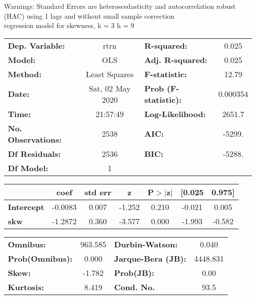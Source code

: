 Warnings: \newline
 [1] Standard Errors are heteroscedasticity and autocorrelation robust (HAC) using 1 lags and without small sample correction\\ 

regression model for skewness, k = 3 h = 9\begin{center}
\begin{tabular}{lclc}
\toprule
\textbf{Dep. Variable:}    &       rtrn       & \textbf{  R-squared:         } &     0.025   \\
\textbf{Model:}            &       OLS        & \textbf{  Adj. R-squared:    } &     0.025   \\
\textbf{Method:}           &  Least Squares   & \textbf{  F-statistic:       } &     12.79   \\
\textbf{Date:}             & Sat, 02 May 2020 & \textbf{  Prob (F-statistic):} &  0.000354   \\
\textbf{Time:}             &     21:57:49     & \textbf{  Log-Likelihood:    } &    2651.7   \\
\textbf{No. Observations:} &        2538      & \textbf{  AIC:               } &    -5299.   \\
\textbf{Df Residuals:}     &        2536      & \textbf{  BIC:               } &    -5288.   \\
\textbf{Df Model:}         &           1      & \textbf{                     } &             \\
\bottomrule
\end{tabular}
\begin{tabular}{lcccccc}
                   & \textbf{coef} & \textbf{std err} & \textbf{z} & \textbf{P$> |$z$|$} & \textbf{[0.025} & \textbf{0.975]}  \\
\midrule
\textbf{Intercept} &      -0.0083  &        0.007     &    -1.252  &         0.210        &       -0.021    &        0.005     \\
\textbf{skw}       &      -1.2872  &        0.360     &    -3.577  &         0.000        &       -1.993    &       -0.582     \\
\bottomrule
\end{tabular}
\begin{tabular}{lclc}
\textbf{Omnibus:}       & 963.585 & \textbf{  Durbin-Watson:     } &    0.040  \\
\textbf{Prob(Omnibus):} &   0.000 & \textbf{  Jarque-Bera (JB):  } & 4448.831  \\
\textbf{Skew:}          &  -1.782 & \textbf{  Prob(JB):          } &     0.00  \\
\textbf{Kurtosis:}      &   8.419 & \textbf{  Cond. No.          } &     93.5  \\
\bottomrule
\end{tabular}
\end{center}

